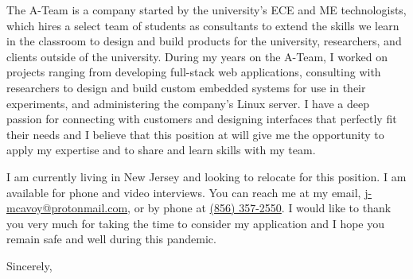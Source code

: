 \documentclass[11pt]{letter} %
\makeatletter
\newcommand{\myphonenumber}{\href{tel:+18563572550}{(856) 357-2550}}
\newcommand{\myemail}{\href{mailto:j-mcavoy@protonmail.com}{j-mcavoy@protonmail.com}}
\makeatother
\begin{document}
\begin{letter}{\companyaddress}
The A-Team is a company started by the university's ECE and ME technologists,
which hires a select team of students as consultants to extend the skills we
learn in the classroom to design and build products for the university,
researchers, and clients outside of the university. During my
years on the A-Team, I worked on projects ranging from developing full-stack web
applications, consulting with researchers to design and build custom embedded
systems for use in their experiments, and administering the company's Linux server.
I have a deep passion for connecting with customers and designing interfaces
that perfectly fit their needs and I believe that this position at {\company}
will give me the opportunity to apply my expertise and to share and learn
skills with my team.


I am currently living in New Jersey and looking to relocate for this position. I
am available for phone and video interviews. You can reach me at my email,
\myemail, or by phone at \myphonenumber. I would like to thank you very much for
taking the time to consider my application and I hope you remain safe and well
during this pandemic.

\closing{Sincerely,}



\end{letter}
\end{document}
